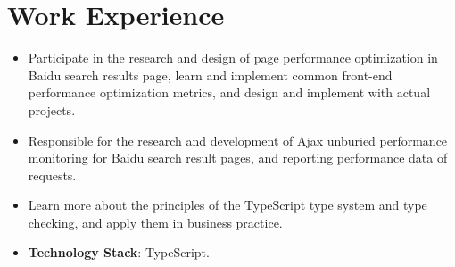 \documentclass{resume}
\newcommand{\en}[1]{#1}
\newcommand{\zh}[1]{}
\begin{document}
\section{\en{Work Experience}\zh{工作经历}}
\en{}
\zh{\datedsubsection{\textbf{\href{https://home.baidu.com/}{百度（Baidu Inc.）}}}{2022/06 -- 至今}}
\en{}
\zh{\role{搜索产品研发部}{前端研发实习}}
\begin{itemize}
  \item \en{Participate in the research and design of page performance optimization in Baidu search results page, learn and implement common front-end performance optimization metrics, and design and implement with actual projects.}
        \zh{参与百度搜索结果页中页面性能优化的调研与设计，学习和落地常见的前端性能优化指标，并结合实际项目进行设计和实现}
  \item \en{Responsible for the research and development of Ajax unburied performance monitoring for Baidu search result pages, and reporting performance data of requests.}
        \zh{负责百度搜索结果页 Ajax 无埋点性能监控的调研与开发，对请求的性能数据进行上报}
  \item \en{Learn more about the principles of the TypeScript type system and type checking, and apply them in business practice.}
        \zh{进一步学习深入学习 TypeScript 类型系统与类型检查的原理，并在业务实践中加以应用}
  \item \en{\textbf{Technology Stack}: TypeScript.}
        \zh{\textbf{技术栈}: TypeScript}
\end{itemize}
\end{document}
